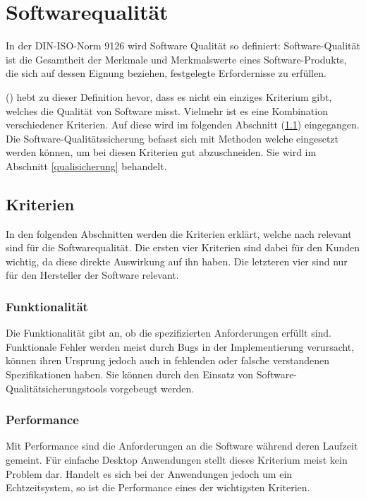 
\section{Softwarequalität}\label{softwarequality}
In der DIN-ISO-Norm 9126 wird Software Qualität so definiert:
\dq Software-Qualität ist die Gesamtheit der Merkmale und Merkmalswerte eines Software-Produkts, die sich auf dessen Eignung beziehen, festgelegte Erfordernisse zu erfüllen.\dq

\citeauthor{hoffmann2013software} (\citeyear{hoffmann2013software}) hebt zu dieser Definition hevor, dass es nicht ein einziges Kriterium gibt, welches die Qualität von Software misst.
Vielmehr ist es eine Kombination verschiedener Kriterien.
Auf diese wird im folgenden Abschnitt (\ref{kriterien}) eingegangen.
Die Software-Qualitätssicherung befasst sich mit Methoden welche eingesetzt werden können, um bei diesen Kriterien gut abzuschneiden.
Sie wird im Abschnitt \ref{qualisicherung} behandelt.

\subsection{Kriterien}\label{kriterien}
In den folgenden Abschnitten werden die Kriterien erklärt, welche nach \citeauthor{hoffmann2013software} relevant sind für die Softwarequalität.
Die ersten vier Kriterien sind dabei für den Kunden wichtig, da diese direkte Auswirkung auf ihn haben.
Die letzteren vier sind nur für den Hersteller der Software relevant.
\subsubsection{Funktionalität}
Die Funktionalität gibt an, ob die spezifizierten Anforderungen erfüllt sind.
Funktionale Fehler werden meist durch Bugs in der Implementierung verursacht, können ihren Ursprung jedoch auch in fehlenden oder falsche verstandenen Spezifikationen haben.
Sie können durch den Einsatz von Software-Qualitätsicherungstools vorgebeugt werden.

\subsubsection{Performance}
Mit Performance sind die Anforderungen an die Software während deren Laufzeit gemeint.
Für einfache Desktop Anwendungen stellt dieses Kriterium meist kein Problem dar.
Handelt es sich bei der Anwendungen jedoch um ein Echtzeitsystem, so ist die Performance eines der wichtigsten Kriterien.

